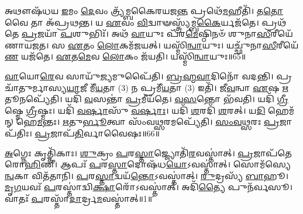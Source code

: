 𑌅𑌥𑍗𑌷᳴𑌧𑌯 \ul{𑌇}\-𑌮𑌂 \ul{𑌦𑍇}\-𑌵𑌂 𑌤𑍍𑌰𑍍𑌯᳴𑌮𑍍𑌬𑌕𑍈𑌰𑌯𑌜\-\ul{𑌨𑍍𑌤} 𑌪𑍍𑌰𑌥𑍇᳴\-\ul{𑌮}\-𑌹𑍀𑌤𑌿᳴।
𑌤\-\ul{𑌤𑍋} 𑌵𑍈 𑌤𑌾 𑌅᳴𑌪𑍍𑌰𑌥𑌨𑍍𑌤।
𑌯 \ul{𑌏}\-𑌵𑌂 \ul{𑌵𑌿}\-𑌦𑍍𑌵𑌾𑍟𑌸𑍍𑌤𑍍𑌰𑍍𑌯᳴𑌮𑍍𑌬\-\ul{𑌕𑍈}\-𑌰𑍍𑌯𑌜᳴𑌤𑍇।
𑌪𑍍𑌰𑌥᳴𑌤𑍇 \ul{𑌪𑍍𑌰}\-𑌜𑌯𑌾᳴ \ul{𑌪}\-𑌶𑍁𑌭𑌿𑌃᳴।
𑌅𑌥᳴ \ul{𑌵𑌾}\-𑌯𑍁𑌃 𑌪᳴𑌰\-\ul{𑌮𑍇}\-𑌷𑍍𑌠𑌿𑌨𑍞᳴ 𑌶𑍁𑌨𑌾\-\ul{𑌸𑍀}\-𑌰𑍀𑌯𑍇᳴𑌣𑌾𑌯𑌜𑌤।
𑌸 \ul{𑌏}\-𑌤𑌂 \ul{𑌲𑍋}\-𑌕𑌮᳴𑌜𑌯𑌤𑍍।
𑌯𑌸𑍍𑌮𑌿᳴\-\ul{𑌨𑍍𑌵𑌾}\-𑌯𑍁𑌃।
𑌯𑌚𑍍𑌛𑍁᳴𑌨𑌾\-\ul{𑌸𑍀}\-𑌰𑍀𑌯𑍇᳴\-\ul{𑌣} 𑌯𑌜᳴𑌤𑍇।
\-\ul{𑌏}\-𑌤\-\ul{𑌮𑍇}\-𑌵 \ul{𑌲𑍋}\-𑌕𑌂 𑌜᳴𑌯𑌤𑌿।
𑌯𑌸𑍍𑌮𑌿᳴\-\ul{𑌨𑍍𑌵𑌾}\-𑌯𑍁𑌃॥65॥

\-\ul{𑌵𑌾}\-𑌯𑍋\-\ul{𑌰𑍇}\-𑌵 𑌸𑌾𑌯𑍁᳴\-\ul{𑌜𑍍𑌯}\-𑌮𑍁𑌪𑍈᳴𑌤𑌿।
\-\ul{𑌬𑍍𑌰}\-\-\ul{𑌹𑍍𑌮}\-\-\ul{𑌵𑌾}\-𑌦𑌿𑌨𑍋᳴ 𑌵𑌦𑌨𑍍𑌤𑌿।
𑌪𑍍𑌰 𑌚𑌾᳴𑌤𑍁𑌰𑍍𑌮𑌾𑌸𑍍𑌯\-\ul{𑌯𑌾}\-𑌜𑍀 𑌮𑍀᳴\-\ul{𑌯}\-𑌤𑌾 (3) 𑌨 𑌪𑍍𑌰𑌮𑍀᳴\-\ul{𑌯}\-𑌤𑌾 (3) 𑌇𑌤𑌿᳴।
𑌜𑍀\-\ul{𑌵}\-𑌨𑍍𑌵𑌾 \ul{𑌏}\-𑌷 \ul{𑌋}\-𑌤𑍂𑌨𑌪𑍍𑌯𑍇᳴𑌤𑌿।
𑌯𑌦𑌿᳴ \ul{𑌵}\-𑌸𑌨𑍍𑌤𑌾॑ \ul{𑌪𑍍𑌰}\-𑌮𑍀𑌯᳴𑌤𑍇।
\-\ul{𑌵}\-\-\ul{𑌸}\-𑌨𑍍𑌤𑍋 𑌭᳴𑌵𑌤𑌿।
𑌯𑌦𑌿᳴ \ul{𑌗𑍍𑌰𑍀}\-𑌷𑍍𑌮𑍇 \ul{𑌗𑍍𑌰𑍀}\-𑌷𑍍𑌮𑌃।
𑌯𑌦𑌿᳴ \ul{𑌵}\-\-\ul{𑌰𑍍}\-𑌷𑌾𑌸𑍁᳴ \ul{𑌵}\-\-\ul{𑌰𑍍}\-𑌷𑌾𑌃।
𑌯𑌦𑌿᳴ \ul{𑌶}\-𑌰𑌦𑌿᳴ \ul{𑌶}\-𑌰𑌤𑍍।
𑌯\-\ul{𑌦𑌿} 𑌹𑍇𑌮᳴𑌨𑍍 𑌹𑍇\-\ul{𑌮}\-𑌨𑍍𑌤𑌃।
\-\ul{𑌋}\-𑌤𑍁\-\ul{𑌰𑍍𑌭𑍂}\-𑌤𑍍𑌵𑌾 𑌸𑌂᳴𑌵\-\ul{𑌥𑍍𑌸}\-𑌰𑌮𑌪𑍍𑌯𑍇᳴𑌤𑌿।
\-\ul{𑌸𑌂}\-\-\ul{𑌵}\-\-\ul{𑌥𑍍𑌸}\-𑌰𑌃 \ul{𑌪𑍍𑌰}\-𑌜𑌾\-𑌪᳴𑌤𑌿𑌃।
\-\ul{𑌪𑍍𑌰}\-𑌜𑌾𑌪᳴\-\ul{𑌤𑌿}\-𑌰𑍍𑌵𑌾𑌵𑍈𑌷𑌃॥66॥






\clearpage
{}
\setcounter{anuvakam}{0}

\-\ul{𑌅}\-𑌗𑍍𑌨𑍇𑌃 𑌕𑍃𑌤𑍍𑌤𑌿᳴𑌕𑌾𑌃।
\-\ul{𑌶𑍁}\-𑌕𑍍𑌰𑌂 \ul{𑌪}\-𑌰\-\ul{𑌸𑍍𑌤𑌾}\-𑌜𑍍𑌜𑍍𑌯𑍋𑌤𑌿᳴\-\ul{𑌰}\-𑌵𑌸𑍍𑌤𑌾॑𑌤𑍍।
\-\ul{𑌪𑍍𑌰}\-𑌜𑌾𑌪᳴𑌤𑍇 𑌰𑍋\-\ul{𑌹𑌿}\-𑌣𑍀।
𑌆𑌪𑌃᳴ \ul{𑌪}\-𑌰\-\ul{𑌸𑍍𑌤𑌾}\-𑌦𑍋𑌷᳴𑌧\-\ul{𑌯𑍋}\-\-𑌽𑌵𑌸𑍍𑌤𑌾॑𑌤𑍍।
𑌸𑍋𑌮᳴𑌸𑍍𑌯𑍇\-\ul{𑌨𑍍𑌵}\-𑌕𑌾 𑌵𑌿𑌤᳴𑌤𑌾𑌨𑌿।
\-\ul{𑌪}\-𑌰\-\ul{𑌸𑍍𑌤𑌾}\-𑌦𑍍𑌵𑌯᳴\-\ul{𑌨𑍍𑌤𑍋}\-\-𑌽𑌵𑌸𑍍𑌤𑌾॑𑌤𑍍।
\-\ul{𑌰𑍁}\-𑌦𑍍𑌰𑌸𑍍𑌯᳴ \ul{𑌬𑌾}\-𑌹𑍂।
\-\ul{𑌮𑍃}\-\-\ul{𑌗}\-𑌯𑌵𑌃᳴ \ul{𑌪}\-𑌰𑌸𑍍𑌤𑌾॑𑌦𑍍𑌵𑌿\-\ul{𑌕𑍍𑌷𑌾}\-𑌰𑍋᳴\-𑌽𑌵𑌸𑍍𑌤𑌾॑𑌤𑍍।
𑌅𑌦𑌿᳴\-\ul{𑌤𑍍𑌯𑍈} 𑌪𑍁𑌨᳴𑌰𑍍𑌵𑌸𑍂।
𑌵𑌾𑌤𑌃᳴ \ul{𑌪}\-𑌰𑌸𑍍𑌤𑌾᳴\-\ul{𑌦𑌾}\-𑌰𑍍𑌦𑍍𑌰\-\ul{𑌮}\-𑌵𑌸𑍍𑌤𑌾॑𑌤𑍍॥1॥

